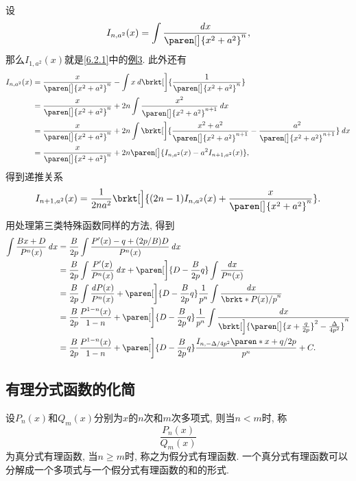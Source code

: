 \documentclass[a4paper,punct=CCT]{ctexbook}
\theoremstyle{break}
\let\geq\geqslant
\let\ge\geq}
\begin{document}
\begin{enumerate}
  设
  \[
    I_{n,a^2}(x) = \int \frac{\dx}{\paren[\big]{x^2 + a^2}^n},
  \]
  那么\(I_{1,a^2}(x)\)就是\ref{6.2.1}中的\hyperlink{E:arctan}{例3}.  此外还有
  \begin{align*}
    I_{n,a^2}(x)
    &= \frac{x}{\paren[\big]{x^2 + a^2}^n} - \int x \diff\brkt[\bigg]{\frac{1}{\paren[\big]{x^2 + a^2}^n}} \\
    &= \frac{x}{\paren[\big]{x^2 + a^2}^n} + 2n \int \frac{x^2}{\paren[\big]{x^2 + a^2}^{n+1}} \dx \\
    &= \frac{x}{\paren[\big]{x^2 + a^2}^n} + 2n \int \brkt[\bigg]{\frac{x^2 + a^2}{\paren[\big]{x^2 + a^2}^{n+1}} - \frac{a^2}{\paren[\big]{x^2 + a^2}^{n+1}}} \dx \\
    &= \frac{x}{\paren[\big]{x^2 + a^2}^n} + 2n \paren[\big]{I_{n,a^2}(x) - a^2 I_{n+1,a^2}(x)},
  \end{align*}
  得到递推关系
  \begin{equation}
    I_{n+1,a^2}(x) = \frac{1}{2na^2} \brkt[\Big]{(2n-1) I_{n,a^2}(x) + \frac{x}{\paren[\big]{x^2 + a^2}^n}}.
  \end{equation}
  用处理第三类特殊函数同样的方法, 得到
  \begin{align*}
    \int \frac{Bx+D}{P^n(x)} \dx
    &= \frac{B}{2p} \int \frac{P'(x) - q + (2p/B)D}{P^n(x)} \dx \\
    &= \frac{B}{2p} \int \frac{P'(x)}{P^n(x)} \dx + \paren[\bigg]{D - \frac{B}{2p} q} \int \frac{\dx}{P^n(x)} \\
    &= \frac{B}{2p} \int \frac{\diff P(x)}{P^n(x)} + \paren[\bigg]{D - \frac{B}{2p} q} \frac1{p^n} \int \frac{\dx}{\brkt*{P(x)/p}^n} \\
    &= \frac{B}{2p} \frac{P^{1-n}(x)}{1-n} + \paren[\bigg]{D - \frac{B}{2p} q} \frac1{p^n} \int \frac{\dx}{\brkt[\Big]{\paren[\big]{x+\frac{q}{2p}}^2 - \frac{\Delta}{4p^2}}^n} \\
    &= \frac{B}{2p} \frac{P^{1-n}(x)}{1-n} + \paren[\bigg]{D - \frac{B}{2p} q} \frac{I_{n,-\Delta/4p^2}\paren*{x+q/2p}}{p^n} + C.
  \end{align*}
\end{enumerate}

\subsection{有理分式函数的化简}

设\(P_n(x)\)和\(Q_m(x)\)分别为\(x\)的\(n\)次和\(m\)次多项式, 则当\(n < m\)时, 称
\[
  \frac{P_n(x)}{Q_m(x)}
\]
为真分式有理函数, 当\(n \ge m\)时, 称之为假分式有理函数.  一个真分式有理函数可以分解成一个多项式与一个假分式有理函数的和的形式.
\end{document}
